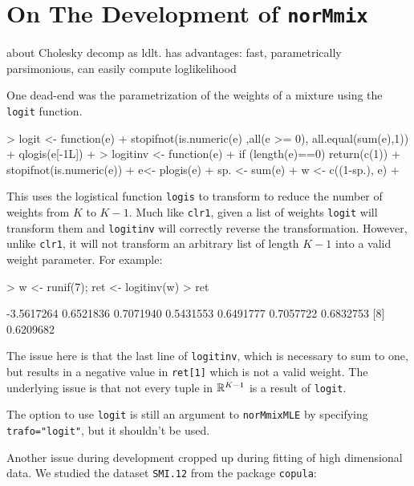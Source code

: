 \section{On The Development of {\tt norMmix}}
\label{sec:devel}

about Cholesky decomp as ldlt. has advantages: fast, parametrically 
parsimonious, can easily compute loglikelihood


One dead-end was the parametrization of the weights of a mixture using the 
{\tt logit} function.

\begin{Schunk}
\begin{Sinput}
> logit <- function(e) {
+     stopifnot(is.numeric(e) ,all(e >= 0), all.equal(sum(e),1))
+     qlogis(e[-1L])
+ }
> logitinv <- function(e) {
+     if (length(e)==0) {return(c(1))}
+     stopifnot(is.numeric(e))
+     e<- plogis(e)
+     sp. <- sum(e)
+     w <- c((1-sp.), e)
+ }
\end{Sinput}
\end{Schunk}

This uses the logistical function {\tt logis} to transform to reduce the number
of weights from $K$ to $K-1$. Much like {\tt clr1}, given a list of weights 
{\tt logit} will transform them and {\tt logitinv} will correctly reverse the 
transformation. However, unlike {\tt clr1}, it will not transform an arbitrary 
list of length $K-1$ into a valid weight parameter. For example:

\begin{Schunk}
\begin{Sinput}
> w <- runif(7); ret <- logitinv(w)
> ret
\end{Sinput}
\begin{Soutput}
[1] -3.5617264  0.6521836  0.7071940  0.5431553  0.6491777  0.7057722  0.6832753
[8]  0.6209682
\end{Soutput}
\end{Schunk}

The issue here is that the last line of {\tt logitinv}, which is necessary to 
sum to one, but results in a negative value in {\tt ret[1]} which is not a 
valid weight. The underlying issue is that not every tuple in $\mathbb{R}^{K-1}$ is 
a result of {\tt logit}.

The option to use {\tt logit} is still an argument to {\tt norMmixMLE} by 
specifying {\tt trafo="logit"}, but it shouldn't be used.



Another issue during development cropped up during fitting of high dimensional
data. We studied the dataset {\tt SMI.12} from the package {\tt copula}:

